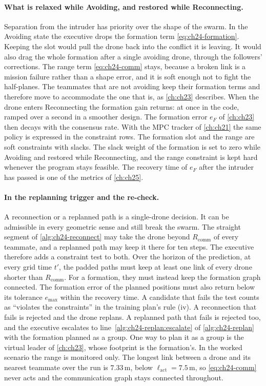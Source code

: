 \paragraph{What is relaxed while Avoiding, and restored while Reconnecting.}
Separation from the intruder has priority over the shape of the swarm. In
the Avoiding state the executive drops the formation term
\cref{eq:ch24-formation}. Keeping the slot would pull the drone back into the
conflict it is leaving. It would also drag the whole formation after a
single avoiding drone, through the followers' corrections. The range term
\cref{eq:ch24-comm} stays, because a broken link is a mission failure rather
than a shape error, and it is soft enough not to fight the half-planes. The
teammates that are not avoiding keep their formation terms and therefore
move to accommodate the one that is, as \cref{ch:ch23} describes. When the
drone enters Reconnecting the formation gain returns: at once in the code,
ramped over a second in a smoother design. The formation error $e_F$ of
\cref{ch:ch23} then decays with the consensus rate. With the MPC tracker of
\cref{ch:ch21} the same policy is expressed in the constraint rows. The
formation slot and the range are soft constraints with slacks. The slack
weight of the formation is set to zero while Avoiding and restored while
Reconnecting, and the range constraint is kept hard whenever the program
stays feasible. The recovery time of $e_F$ after the intruder has passed is
one of the metrics of \cref{ch:ch25}.

\paragraph{In the replanning trigger and the re-check.}
A reconnection or a replanned path is a single-drone decision. It can
be admissible in every geometric sense and still break the swarm. The
straight segment of \cref{alg:ch24-reconnect} may take the drone beyond
$R_{\mathrm{comm}}$ of every teammate, and a replanned path may keep it
there for ten steps. The executive therefore adds a constraint test to both.
Over the horizon of the prediction, at every grid time $t'$, the padded
paths must keep at least one link of every drone shorter than
$R_{\mathrm{comm}}$. For a formation, they must instead keep the formation
graph connected. The formation error of the planned positions must also return
below its tolerance $e_{\max}$ within the recovery time. A candidate that
fails the test counts as ``violates the constraints'' in the training
plan's rule (iv). A reconnection that fails is rejected and the drone
replans. A replanned path that fails is rejected too, and the executive
escalates to line~\ref{alg:ch24-replan:escalate} of \cref{alg:ch24-replan}
with the formation planned as a group. One way to plan it as a group is the
virtual leader of \cref{ch:ch23}, whose footprint is the formation's. In the
worked scenario the range is monitored only. The longest link between a
drone and its nearest teammate over the run is $7.33$\,m, below
$\ell_{\mathrm{act}} = 7.5$\,m, so \cref{eq:ch24-comm} never acts and the
communication graph stays connected throughout.

